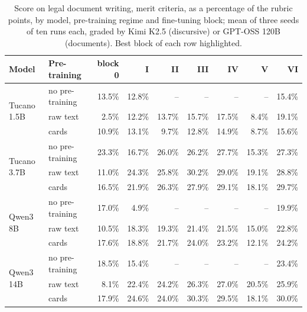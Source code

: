 \documentclass{IOS-Book-Article}
\begin{document}
\begin{table}[!ht]
\centering
\caption{Score on legal document writing, merit criteria, as a percentage of the rubric points, by model, pre-training regime and fine-tuning block; mean of three seeds of ten runs each, graded by Kimi K2.5 (discursive) or GPT-OSS 120B (documents). Best block of each row highlighted.}
\footnotesize\setlength{\tabcolsep}{3pt}
\begin{tabular}{llrrrrrrr}
\hline
\textbf{Model} & \textbf{Pre-training} & \textbf{block 0} & \textbf{I} & \textbf{II} & \textbf{III} & \textbf{IV} & \textbf{V} & \textbf{VI} \\
\hline
\multirow{3}{*}{Tucano 1.5B} & no pre-training & 13.5\% & 12.8\% & -- & -- & -- & -- & 15.4\% \\
 & raw text & 2.5\% & 12.2\% & 13.7\% & 15.7\% & 17.5\% & 8.4\% & 19.1\% \\
 & cards & 10.9\% & 13.1\% & 9.7\% & 12.8\% & 14.9\% & 8.7\% & 15.6\% \\
\multirow{3}{*}{Tucano 3.7B} & no pre-training & 23.3\% & 16.7\% & 26.0\% & 26.2\% & 27.7\% & 15.3\% & 27.3\% \\
 & raw text & 11.0\% & 24.3\% & 25.8\% & 30.2\% & 29.0\% & 19.1\% & 28.8\% \\
 & cards & 16.5\% & 21.9\% & 26.3\% & 27.9\% & 29.1\% & 18.1\% & 29.7\% \\
\multirow{3}{*}{Qwen3 8B} & no pre-training & 17.0\% & 4.9\% & -- & -- & -- & -- & 19.9\% \\
 & raw text & 10.5\% & 18.3\% & 19.3\% & 21.4\% & 21.5\% & 15.0\% & 22.8\% \\
 & cards & 17.6\% & 18.8\% & 21.7\% & 24.0\% & 23.2\% & 12.1\% & 24.2\% \\
\multirow{3}{*}{Qwen3 14B} & no pre-training & 18.5\% & 15.4\% & -- & -- & -- & -- & 23.4\% \\
 & raw text & 8.1\% & 22.4\% & 24.2\% & 26.3\% & 27.0\% & 20.5\% & 25.9\% \\
 & cards & 17.9\% & 24.6\% & 24.0\% & 30.3\% & 29.5\% & 18.1\% & 30.0\% \\
\hline
\end{tabular}
\end{table}
\end{document}
